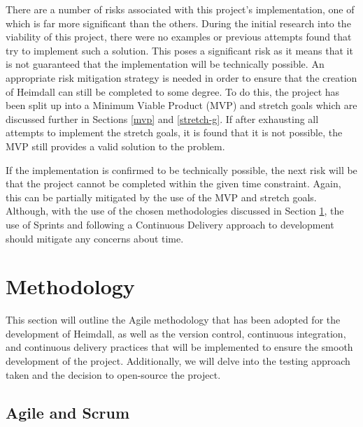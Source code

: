 \documentclass{article}
\begin{document}
There are a number of risks associated with this project's implementation, one of which is far more significant than the others. During the initial research into the viability of this project, there were no examples or previous attempts found that try to implement such a solution. This poses a significant risk as it means that it is not guaranteed that the implementation will be technically possible. An appropriate risk mitigation strategy is needed in order to ensure that the creation of Heimdall can still be completed to some degree. To do this, the project has been split up into a Minimum Viable Product (MVP) and stretch goals which are discussed further in Sections \ref{mvp} and \ref{stretch-g}. If after exhausting all attempts to implement the stretch goals, it is found that it is not possible, the MVP still provides a valid solution to the problem. \\\par If the implementation is confirmed to be technically possible, the next risk will be that the project cannot be completed within the given time constraint. Again, this can be partially mitigated by the use of the MVP and stretch goals. Although, with the use of the chosen methodologies discussed in Section \ref{methodology}, the use of Sprints and following a Continuous Delivery approach to development should mitigate any concerns about time.



 
\section{Methodology} \label{methodology}

This section will outline the Agile methodology that has been adopted for the development of Heimdall, as well as the version control, continuous integration, and continuous delivery practices that will be implemented to ensure the smooth development of the project. Additionally, we will delve into the testing approach taken and the decision to open-source the project.


\subsection{Agile and Scrum} \label{agile}
\end{document}
